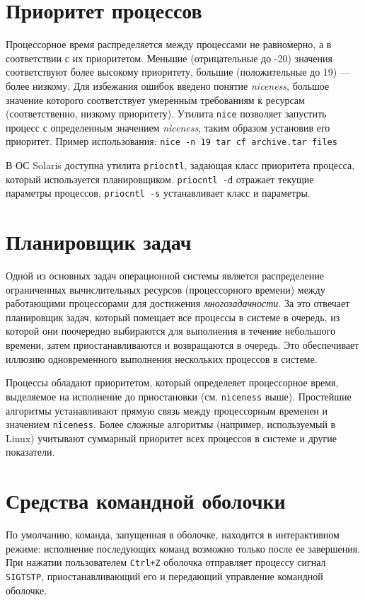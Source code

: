 \documentclass[listings]{labreport}
\begin{document}
\section*{Приоритет процессов}

Процессорное время распределяется между процессами не равномерно, а в соответствии с их приоритетом.
Меньшие (отрицательные до -20) значения соответствуют более высокому приоритету, большие (положительные до 19) — более низкому.
Для избежания ошибок введено понятие \textit{niceness}, большое значение которого соответствует умеренным требованиям к ресурсам
(соответственно, низкому приоритету).
Утилита \texttt{nice} позволяет запустить процесс с определенным значением \textit{niceness}, таким образом установив его приоритет.
Пример использования: \texttt{nice -n 19 tar cf archive.tar files}

В ОС Solaris доступна утилита \texttt{priocntl}, задающая класс приоритета процесса, который используется планировщиком.
\texttt{priocntl -d} отражает текущие параметры процессов, \texttt{priocntl -s} устанавливает класс и параметры.

\section*{Планировщик задач}

Одной из основных задач операционной системы является распределение ограниченных вычислительных ресурсов (процессорного времени)
между работающими процессорами для достижения \textit{многозадачности}. За это отвечает планировщик задач, который помещает
все процессы в системе в очередь, из которой они поочередно выбираются для выполнения в течение небольшого времени,
затем приостанавливаются и возвращаются в очередь. Это обеспечивает иллюзию одновременного выполнения нескольких процессов
в системе.

Процессы обладают приоритетом, который определеяет процессорное время, выделяемое на исполнение до приостановки
(см. \texttt{niceness} выше). Простейшие алгоритмы устанавливают прямую связь между процессорным временен и значением
\texttt{niceness}. Более сложные алгоритмы (например, используемый в Linux) учитывают суммарный приоритет всех процессов
в системе и другие показатели.

\section*{Средства командной оболочки}

По умолчанию, команда, запущенная в оболочке, находится в интерактивном режиме: исполнение последующих команд возможно только после ее завершения.
При нажатии пользователем \texttt{Ctrl+Z} оболочка отправляет процессу сигнал \texttt{SIGTSTP}, приостанавливающий его и 
передающий управление командной оболочке.
\end{document}
